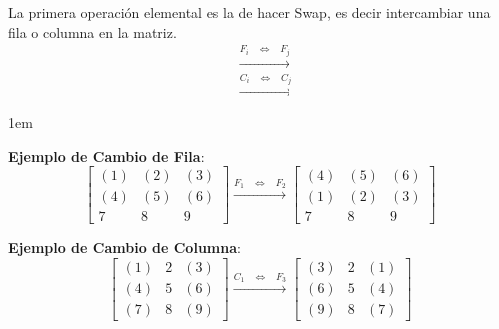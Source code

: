 \documentclass[12pt, fleqn]{report}                             %
\newenvironment{SmallIndentation}[1][0.75em]                    %
        {\begin{adjustwidth}{#1}{}\begin{footnotesize}}             %
        {\end{footnotesize}\end{adjustwidth}}                       %
\DeclareMathOperator \Space {\quad}                             %
\DeclareMathOperator \MiniSpace {\;}                            %
\theoremstyle{break}                                            %
\newcommand \lEqual {\MiniSpace \Leftrightarrow \MiniSpace}     %
\newcommand \lLongTo {\longrightarrow}                          %
\newcommand{\bVector}[1]                                        %
        { \ensuremath{\begin{bmatrix}#1\end{bmatrix}} }             %
\begin{document}
                La primera operación elemental es la de hacer Swap, es decir intercambiar una
                fila o columna en la matriz.
                \begin{align*}
                    &\overset{F_i \lEqual F_j}{\lLongTo}     \\
                    &\overset{C_i \lEqual C_j}{\lLongTo}
                \end{align*}

                \begin{multicols}{2}

                    \begin{SmallIndentation}[1em]
                        \textbf{Ejemplo de Cambio de Fila}:
                            \begin{equation*}
                                \bVector{(1)&(2)&(3)\\(4)&(5)&(6)\\7&8&9}
                                    \overset{F_1 \lEqual F_2}{\lLongTo}
                                \bVector{(4)&(5)&(6)\\(1)&(2)&(3)\\7&8&9}
                            \end{equation*}

                        \vfill
                        
                        \textbf{Ejemplo de Cambio de Columna}:
                            \begin{equation*}
                                \bVector{(1)&2&(3)\\(4)&5&(6)\\(7)&8&(9)}
                                    \overset{C_1 \lEqual F_3}{\lLongTo}
                                \bVector{(3)&2&(1)\\(6)&5&(4)\\(9)&8&(7)}
                            \end{equation*}

                    
                    \end{SmallIndentation}
                        

                \end{multicols}


                \vspace{1em}
\end{document}
